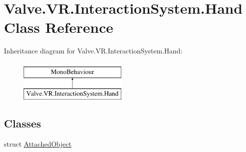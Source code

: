 \hypertarget{class_valve_1_1_v_r_1_1_interaction_system_1_1_hand}{}\section{Valve.\+V\+R.\+Interaction\+System.\+Hand Class Reference}
\label{class_valve_1_1_v_r_1_1_interaction_system_1_1_hand}
Inheritance diagram for Valve.\+V\+R.\+Interaction\+System.\+Hand\+:\begin{figure}[H]
\begin{center}
\leavevmode
\includegraphics[height=2.000000cm]{class_valve_1_1_v_r_1_1_interaction_system_1_1_hand}
\end{center}
\end{figure}
\subsection*{Classes}
\begin{DoxyCompactItemize}
\item 
struct \mbox{\hyperlink{struct_valve_1_1_v_r_1_1_interaction_system_1_1_hand_1_1_attached_object}{Attached\+Object}}
\end{DoxyCompactItemize}
